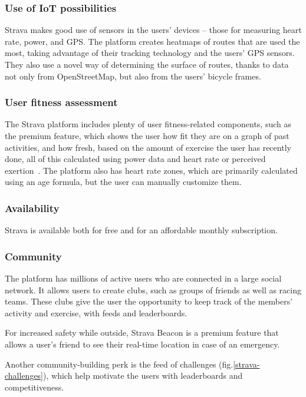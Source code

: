 \subsubsection*{Use of IoT possibilities}
Strava makes good use of sensors in the users' devices -- those for measuring heart rate, power, and GPS.
The platform creates heatmaps of routes that are used the most, taking advantage of their tracking technology and the users' GPS sensors.
They also use a novel way of determining the surface of routes, thanks to data not only from OpenStreetMap, but also from the users' bicycle frames.

\subsubsection*{User fitness assessment}
The Strava platform includes plenty of user fitness-related components, such as the premium  feature,
which shows the user how fit they are on a graph of past activities, and how fresh, based on the amount of exercise the user has recently done,
all of this calculated using power data and heart rate or perceived exertion~\cite{strava-fitness-freshness}.
The platform also has heart rate zones, which are primarily calculated using an age formula, but the user can manually customize them.
\subsubsection*{Availability}
Strava is available both for free and for an affordable monthly subscription.
\subsubsection*{Community}
The platform has millions of active users who are connected in a large social network.
It allows users to create clubs, such as groups of friends as well as racing teams.
These clubs give the user the opportunity to keep track of the members' activity and exercise, with feeds and leaderboards.

For increased safety while outside, Strava Beacon is a premium feature that allows a user's friend to see their real-time location in case of an emergency.

Another community-building perk is the feed of challenges (fig.\ref{strava-challenges}), which help motivate the users with leaderboards and competitiveness.

